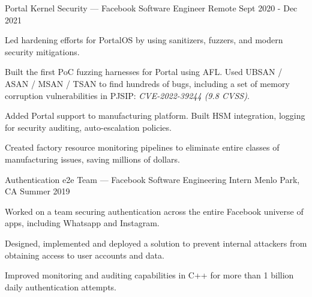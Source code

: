 \begin{cventries}
{\begin{cvitems}
	\end{cvitems}
}
\cventry
{Portal Kernel Security — Facebook} %
{Software Engineer} %
{Remote} %
{Sept 2020 - Dec 2021} %
{
	\begin{cvitems} %
		\item {Led hardening efforts for PortalOS by using sanitizers, fuzzers, and modern security mitigations.} 
		\item {Built the first PoC fuzzing harnesses for Portal using AFL. Used UBSAN / ASAN / MSAN / TSAN to find hundreds of bugs, including a set of memory corruption vulnerabilities in PJSIP: \textit{CVE-2022-39244 (9.8 CVSS)}.}
		\item {Added Portal support to manufacturing platform. Built HSM integration, logging for security auditing, auto-escalation policies.}
		\item {Created factory resource monitoring pipelines to eliminate entire classes of manufacturing issues, saving millions of dollars.}
	\end{cvitems}
}
\cventry
{Authentication e2e Team — Facebook} %
{Software Engineering Intern} %
{Menlo Park, CA} %
{Summer 2019} %
{
	\begin{cvitems} %
		\item {Worked on a team securing authentication across the entire Facebook universe of apps, including Whatsapp and Instagram.}
		\item {Designed, implemented and deployed a solution to prevent internal attackers from obtaining access to user accounts and data.}
		\item {Improved monitoring and auditing capabilities in C++ for more than 1 billion daily authentication attempts.}
	\end{cvitems}
}

\end{cventries}
